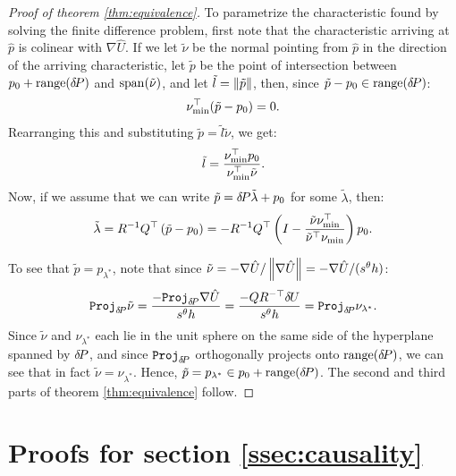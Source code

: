 \documentclass[smallcondensed]{svjour3}
\begin{document}
\begin{proof}[Proof of theorem \ref{thm:equivalence}]
  To parametrize the characteristic found by solving the finite
  difference problem, first note that the characteristic arriving at
  $\hat{p}$ is colinear with $\nabla \hat{U}$. If we let $\tilde{\nu}$
  be the normal pointing from $\hat{p}$ in the direction of the
  arriving characteristic, let $\tilde{p}$ be the point of
  intersection between
  $p_0 + \operatorname{range}({\delta \hspace{-0.14em} P})$ and
  $\operatorname{span}\hspace{-0.15em}{(\tilde{\nu})}$, and let
  $\tilde{l} = \left\|\tilde{p}\right\|$, then, since
  $\tilde{p} - p_0 \in \operatorname{range}({\delta \hspace{-0.14em} P})$:
  \begin{equation}
    \nu_{\operatorname{min}}^\top (\tilde{p} - p_0) = 0.
  \end{equation}
  Rearranging this and substituting
  $\tilde{p} = \tilde{l} \tilde{\nu}$, we get:
  \begin{equation}
    \tilde{l} = \frac{\nu_{\operatorname{min}}^\top p_0}{\nu_{\operatorname{min}}^\top \tilde{\nu}}.
  \end{equation}
  Now, if we assume that we can write
  $\tilde{p} = {\delta \hspace{-0.14em} P} \tilde{\lambda} + p_0$ for some
  $\tilde{\lambda}$, then:
  \begin{equation}
    \tilde{\lambda} = R^{-1} Q^\top \left(\tilde{p} - p_0\right) = -R^{-1} Q^\top \left(I - \frac{\tilde{\nu} \nu_{\operatorname{min}}^\top}{\tilde{\nu}^\top \nu_{\operatorname{min}}}\right) p_0.
  \end{equation}

  To see that $\tilde{p} = p_{\lambda^*}$, note that since
  $\tilde{\nu} = -\nabla \hat{U}/\left\|\nabla \hat{U}\right\| = -\nabla
  \hat{U}/(s^\theta h)$:
  \begin{equation}
    \mathtt{Proj}_{{\delta \hspace{-0.14em} P}} \tilde{\nu} = \frac{-\mathtt{Proj}_{{\delta \hspace{-0.14em} P}} \nabla \hat{U}}{s^\theta h} = \frac{-QR^{-\top} {\delta \hspace{-0.09em} U}}{s^\theta h} = \mathtt{Proj}_{{\delta \hspace{-0.14em} P}} \nu_{\lambda^*}.
  \end{equation}
  Since $\tilde{\nu}$ and $\nu_{\lambda^*}$ each lie in the unit
  sphere on the same side of the hyperplane spanned by ${\delta \hspace{-0.14em} P}$, and
  since $\mathtt{Proj}_{{\delta \hspace{-0.14em} P}}$ orthogonally projects onto
  $\operatorname{range}({\delta \hspace{-0.14em} P})$, we can see that in fact
  $\tilde{\nu} = \nu_{\lambda^*}$. Hence,
  $\tilde{p} = p_{\lambda^*} \in p_0 + \operatorname{range}({\delta \hspace{-0.14em} P})$. The second and
  third parts of theorem \ref{thm:equivalence} follow.
\end{proof}

\section{Proofs for section\@
  \ref{ssec:causality}}\label{sec:causality-proofs}
\end{document}
